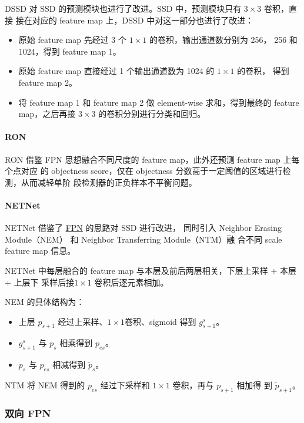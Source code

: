 DSSD 对 SSD 的预测模块也进行了改进。SSD 中，预测模块只有 $3 \times 3$ 卷积，直接
接在对应的 feature map 上，DSSD 中对这一部分也进行了改进：

\begin{itemize}
  \item 原始 feature map 先经过 3 个 $1 \times 1$ 的卷积，输出通道数分别为 256，
    256 和 1024，得到 feature map 1。
  \item 原始 feature map 直接经过 1 个输出通道数为 1024 的 $1 \times 1$ 的卷积，
    得到 feature map 2。
  \item 将 feature map 1 和 feature map 2 做 element-wise 求和，得到最终的
    feature map，之后再接 $3 \times 3$ 的卷积分别进行分类和回归。
\end{itemize}

\paragraph{RON}
RON 借鉴 FPN 思想融合不同尺度的 feature map，此外还预测 feature map 上每个点对应
的 objectness score，仅在 objectness 分数高于一定阈值的区域进行检测，从而减轻单阶
段检测器的正负样本不平衡问题。

\paragraph{NETNet}
NETNet 借鉴了 \hyperref[subsec:FPN]{FPN} 的思路对 SSD 进行改进，
同时引入 Neighbor Erasing Module（NEM） 和 Neighbor Transferring Module（NTM）融
合不同 scale feature map 信息。

NETNet 中每层融合的 feature map 与本层及前后两层相关，下层上采样 + 本层 + 上层下
采样后接$1 \times 1$ 卷积后逐元素相加。

NEM 的具体结构为：
\begin{itemize}
  \item 上层 $p_{s+1}$ 经过上采样、$1 \times 1$卷积、sigmoid 得到 $g_{s+1}^s$。
  \item $g_{s+1}^s$ 与 $p_s$ 相乘得到 $p_{es}$。
  \item $p_s$ 与 $p_{es}$ 相减得到 $\tilde{p}_s$。
\end{itemize}

NTM 将 NEM 得到的 $p_{es}$ 经过下采样和 $1 \times 1$ 卷积，再与 $p_{s+1}$ 相加得
到 $\tilde{p}_{s+1}$。

\subsubsection{双向 FPN}
